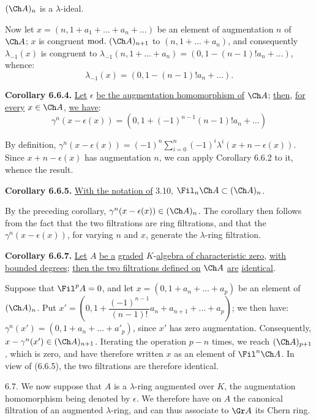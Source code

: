 %
\((\Ch A)_n\) is a \(\lambda\)-ideal.

Now let \(x=(n,1+a_1+\ldots+a_n+\ldots)\) be an element of augmentation \(n\) of \(\Ch A\); \(x\) is congruent \(\mathrm{mod.}\ (\Ch A)_{n+1}\) to \((n,1+\ldots+a_n)\), and consequently \(\lambda_{-1}(x)\) is congruent to \(\lambda_{-1}(n,1+\ldots+a_n)=(0,1-(n-1)!a_n+\ldots)\), whence:
\[
  \lambda_{-1}(x)=(0,1-(n-1)!a_n+\ldots).
\]

\textbf{Corollary 6.6.4.} \uline{Let} \(\epsilon\) \uline{be the augmentation homomorphism of} \(\Ch A\); \uline{then}, \uline{for every} \(x\in\Ch A\), \uline{we have}:
\[
  \gamma^n(x-\epsilon(x))
  =
  (0,1+(-1)^{n-1}(n-1)!a_n+\ldots)
\]

By definition, \(\gamma^n(x-\epsilon(x))=(-1)^n\sum_{i=0}^n(-1)^i\lambda^i(x+n-\epsilon(x))\). Since \(x+n-\epsilon(x)\) has augmentation \(n\), we can apply Corollary 6.6.2 to it, whence the result.

\textbf{Corollary 6.6.5.} \uline{With the notation of} 3.10, \(\Fil_n\Ch A\subset(\Ch A)_n\).

By the preceding corollary, \(\gamma^n(x-\epsilon(x))\in(\Ch A)_n\). The corollary then follows from the fact that the two filtrations are ring filtrations, and that the \(\gamma^n(x-\epsilon(x))\), for varying \(n\) and \(x\), generate the \(\lambda\)-ring filtration.

\textbf{Corollary 6.6.7.} \uline{Let} \(A\) \uline{be a} \uline{graded} \(K\)-\uline{algebra of characteristic zero}, \uline{with bounded degrees}; \uline{then the two filtrations defined on} \(\Ch A\) \uline{are} \uline{identical}.

Suppose that \(\Fil^pA=0\), and let \(x=(0,1+a_n+\ldots+a_p)\) be an element of \((\Ch A)_n\). Put \(x'=\left(0,1+\dfrac{(-1)^{n-1}}{(n-1)!}a_n+a_{n+1}+\ldots+a_p\right)\); we then have:
\(\gamma^n(x')=(0,1+a_n+\ldots+a'_p)\), since \(x'\) has zero augmentation. Consequently,
%
\(x-\gamma^n(x')\in(\Ch A)_{n+1}\). Iterating the operation \(p-n\) times, we reach \((\Ch A)_{p+1}\), which is zero, and have therefore written \(x\) as an element of \(\Fil^n\Ch A\). In view of (6.6.5), the two filtrations are therefore identical.

6.7. We now suppose that \(A\) is a \(\lambda\)-ring augmented over \(K\), the augmentation homomorphism being denoted by \(\epsilon\). We therefore have on \(A\) the canonical filtration of an augmented \(\lambda\)-ring, and can thus associate to \(\Gr A\) its Chern ring.

